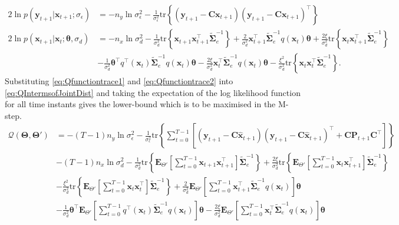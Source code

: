 \documentclass[]{article}
\begin{document}
\begin{align}\label{eq:Qfunctiontrace1}
  2\ln p\left(\mathbf y_{t+1}|\mathbf x_{t+1};\sigma_{\epsilon}\right) &= -n_y\ln \sigma_{\epsilon}^2-\frac{1}{\sigma_{\epsilon}^2}\mathrm{tr}\left\lbrace(\mathbf y_{t+1}-\mathbf C\mathbf  x_{t+1}) (\mathbf y_{t+1}-\mathbf C\mathbf  x_{t+1})^\top\right\rbrace    \\
 2 \ln p(\mathbf x_{t+1}|\mathbf x_{t};\boldsymbol \theta ,\sigma_d) &=-n_x\ln\sigma_d^2-\frac{1}{\sigma_d^2}\mathrm{tr}\left\lbrace\mathbf x_{t+1} \mathbf x_{t+1}^\top\tilde{\boldsymbol\Sigma}_e^{-1}\right\rbrace+\frac{2}{\sigma_d^2}\mathbf x_{t+1}^\top\tilde{\boldsymbol\Sigma}_e^{-1}q( \mathbf x_t)\boldsymbol\theta+\frac{2\xi}{\sigma_d^2} \mathrm{tr} \left\lbrace \mathbf x_t\mathbf x_{t+1}^\top\tilde{\boldsymbol\Sigma}_e^{-1}\right\rbrace \nonumber \\
&-\frac{1}{\sigma_d^2}\boldsymbol\theta^\top q^\top(\mathbf x_t)\tilde{\boldsymbol\Sigma}_e^{-1}q(\mathbf x_t)\boldsymbol\theta-\frac{2\xi}{\sigma_d^2} \mathbf x_t^\top\tilde{\boldsymbol\Sigma}_e^{-1}q(\mathbf x_t)\boldsymbol\theta-\frac{\xi^2}{\sigma_d^2}\mathrm{tr}\left\lbrace \mathbf x_t \mathbf x_t^\top\tilde{\boldsymbol\Sigma}_e^{-1}\right\rbrace. \label{eq:Qfunctiontrace2}
\end{align}
Substituting  \eqref{eq:Qfunctiontrace1} and \eqref{eq:Qfunctiontrace2} into \eqref{eq:QIntermsofJointDist} and taking the expectation of the log likelihood function for all time instants gives the lower-bound which is to be maximised in the M-step. 
\begin{align}\label{eq:Voldermont}
 \mathcal Q(\boldsymbol \Theta,\boldsymbol\Theta')&= -(T-1)n_y\ln \sigma_{\epsilon}^2-\frac{1}{\sigma_{\epsilon}^2}\mathrm{tr}\left\lbrace\boldsymbol\sum_{t=0}^{T-1}\left[ (\mathbf y_{t+1}-\mathbf C\mathbf{\hat{x}}_{t+1}) (\mathbf y_{t+1}-\mathbf C\mathbf{\hat{x}}_{t+1})^\top+\mathbf C \mathbf P_{t+1}\mathbf C^\top\right] \right\rbrace\nonumber \\
&-(T-1)n_x\ln\sigma_d^2-\frac{1}{\sigma_d^2}\mathrm{tr}\left\lbrace \mathbf E_{\Theta'}\left[\sum_{t=0}^{T-1}\mathbf x_{t+1}\mathbf x_{t+1}^\top\right]\tilde{\boldsymbol\Sigma}_e^{-1}\right\rbrace +\frac{2\xi}{\sigma_d^2} \mathrm{tr}\left\lbrace \mathbf E_{\Theta'}\left[\sum_{t=0}^{T-1}\mathbf x_t\mathbf x_{t+1}^\top\right] \tilde{\boldsymbol\Sigma}_e^{-1}\right\rbrace \nonumber \\
&-\frac{\xi^2}{\sigma_d^2}\mathrm{tr} \left\lbrace\mathbf E_{\Theta'}\left[\sum_{t=0}^{T-1}\mathbf x_t\mathbf x_{t}^\top\right]\tilde{\boldsymbol\Sigma}_e^{-1} \right\rbrace +\frac{2}{\sigma_d^2}\mathbf E_{\Theta'}\left[\sum_{t=0}^{T-1}\mathbf x_{t+1}^\top\tilde{\boldsymbol\Sigma}_e^{-1}q( \mathbf x_t)\right]\boldsymbol\theta
 \nonumber \\
&-\frac{1}{\sigma_d^2}\boldsymbol\theta^\top \mathbf E_{\Theta'}\left[\sum_{t=0}^{T-1}  q^\top(\mathbf  x_t)\tilde{\boldsymbol\Sigma}_e^{-1}q(\mathbf x_t)\right]\boldsymbol\theta-\frac{2\xi}{\sigma_d^2} \mathbf E_{\Theta'}\left[\sum_{t=0}^{T-1} \mathbf x_t^\top\tilde{\boldsymbol\Sigma}_e^{-1}q(\mathbf x_t)  \right] \boldsymbol\theta
\end{align}
\end{document}
